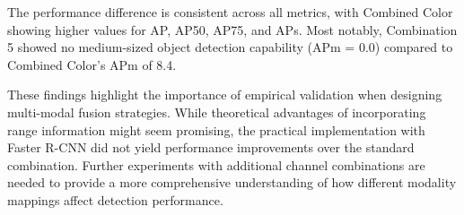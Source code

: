 \documentclass[11pt]{article}
\begin{document}
The performance difference is consistent across all metrics, with Combined Color showing higher values for AP, AP50, AP75, and APs. Most notably, Combination 5 showed no medium-sized object detection capability (APm = 0.0) compared to Combined Color's APm of 8.4.

These findings highlight the importance of empirical validation when designing multi-modal fusion strategies. While theoretical advantages of incorporating range information might seem promising, the practical implementation with Faster R-CNN did not yield performance improvements over the standard combination. Further experiments with additional channel combinations are needed to provide a more comprehensive understanding of how different modality mappings affect detection performance.
\end{document}
